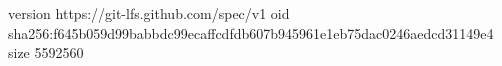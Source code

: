 version https://git-lfs.github.com/spec/v1
oid sha256:f645b059d99babbdc99ecaffcdfdb607b945961e1eb75dac0246aedcd31149e4
size 5592560
